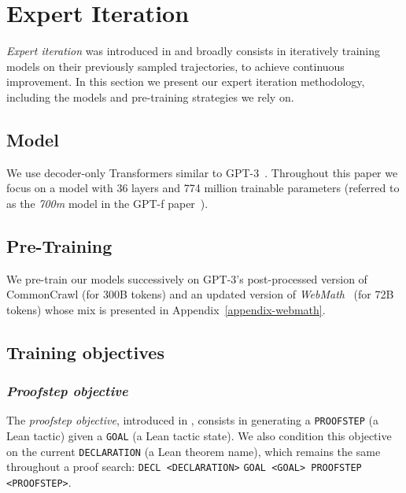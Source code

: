 \documentclass[nohyperref]{article}
\theoremstyle{plain}
\theoremstyle{definition}
\theoremstyle{remark}
\begin{document}
\section{Expert Iteration}

\textit{Expert iteration} was introduced in \citet{silver2017mastering} and broadly consists in iteratively training models on their previously sampled trajectories, to achieve continuous improvement. In this section we present our expert iteration methodology, including the models and pre-training strategies we rely on.

\subsection{Model}

We use decoder-only Transformers similar to GPT-3~\cite{brown2020language}. Throughout this paper we focus on a model with 36 layers and 774 million trainable parameters (referred to as the \textit{700m} model in the GPT-f paper~\cite{polu2020generative}).

\subsection{Pre-Training}
\label{pre-training}

We pre-train our models successively on GPT-3's post-processed version of CommonCrawl (for 300B tokens) and an updated version of \textit{WebMath}~\cite{polu2020generative} (for 72B tokens) whose mix is presented in Appendix~\ref{appendix-webmath}.

\subsection{Training objectives}

\subsubsection{\textit{Proofstep objective}}

The \textit{proofstep objective}, introduced in \citet{polu2020generative}, consists in generating a \texttt{PROOFSTEP} (a Lean tactic) given a \texttt{GOAL} (a Lean tactic state). We also condition this objective on the current \texttt{DECLARATION} (a Lean theorem name), which remains the same throughout a proof search: \verb|DECL <DECLARATION>| \verb|GOAL <GOAL> PROOFSTEP <PROOFSTEP>|.
\end{document}
